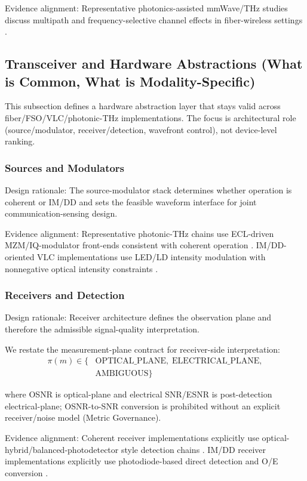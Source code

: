 \documentclass[lettersize,journal]{IEEEtran}
\begin{document}
Evidence alignment: Representative photonics-assisted mmWave/THz studies discuss multipath and frequency-selective channel effects in fiber-wireless settings \cite{O_ISAC_241,O_ISAC_077}.
\subsection{Transceiver and Hardware Abstractions (What is Common, What is Modality-Specific)}
This subsection defines a hardware abstraction layer that stays valid across fiber/FSO/VLC/photonic-THz implementations. The focus is architectural role (source/modulator, receiver/detection, wavefront control), not device-level ranking.

\subsubsection{Sources and Modulators}
Design rationale: The source-modulator stack determines whether operation is coherent or IM/DD and sets the feasible waveform interface for joint communication-sensing design.

Evidence alignment: Representative photonic-THz chains use ECL-driven MZM/IQ-modulator front-ends consistent with coherent operation \cite{O_ISAC_029}. IM/DD-oriented VLC implementations use LED/LD intensity modulation with nonnegative optical intensity constraints \cite{O_ISAC_001}.

\subsubsection{Receivers and Detection}
Design rationale: Receiver architecture defines the observation plane and therefore the admissible signal-quality interpretation.

We restate the measurement-plane contract for receiver-side interpretation:
\begin{equation}
\label{eq:receiver_plane_contract}
\begin{aligned}
\pi(m)\in\{&\text{OPTICAL\_PLANE},\;\text{ELECTRICAL\_PLANE},\\
&\text{AMBIGUOUS}\}
\end{aligned}
\end{equation}

where OSNR is optical-plane and electrical SNR/ESNR is post-detection electrical-plane; OSNR-to-SNR conversion is prohibited without an explicit receiver/noise model (Metric Governance).

Evidence alignment: Coherent receiver implementations explicitly use optical-hybrid/balanced-photodetector style detection chains \cite{O_ISAC_028,O_ISAC_029}. IM/DD receiver implementations explicitly use photodiode-based direct detection and O/E conversion \cite{O_ISAC_001,O_ISAC_023}.
\end{document}

